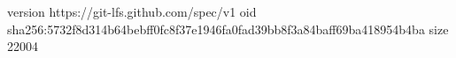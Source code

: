 version https://git-lfs.github.com/spec/v1
oid sha256:5732f8d314b64bebff0fc8f37e1946fa0fad39bb8f3a84baff69ba418954b4ba
size 22004
